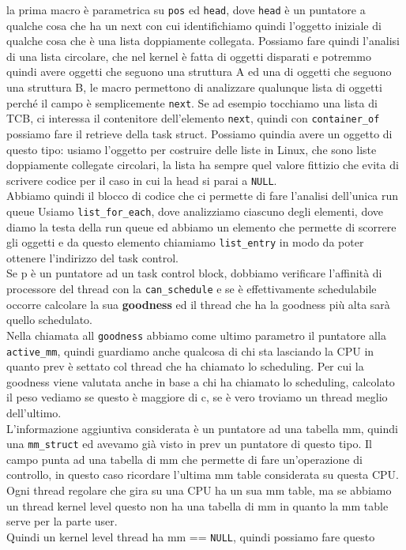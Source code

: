\documentclass[12pt, oneside]{extbook}
\begin{document}
la prima macro è parametrica su \texttt{pos} ed \texttt{head}, dove \texttt{head} è un puntatore a qualche cosa che ha un next con cui identifichiamo quindi l'oggetto iniziale di qualche cosa che è una lista doppiamente collegata. Possiamo fare quindi l'analisi di una lista circolare, che nel kernel è fatta di oggetti disparati e potremmo quindi avere oggetti che seguono una struttura A ed una di oggetti che seguono una struttura B, le macro permettono di analizzare qualunque lista di oggetti perché il campo è semplicemente \texttt{next}. Se ad esempio tocchiamo una lista di TCB, ci interessa il contenitore dell'elemento \texttt{next}, quindi con \texttt{container\_of} possiamo fare il retrieve della task struct. Possiamo quindia avere un oggetto di questo tipo:
usiamo l'oggetto per costruire delle liste in Linux, che sono liste doppiamente collegate circolari, la lista ha sempre quel valore fittizio che evita di scrivere codice per il caso in cui la head si parai a \texttt{NULL}.\\Abbiamo quindi il blocco di codice che ci permette di fare l'analisi dell'unica run queue
Usiamo \texttt{list\_for\_each}, dove analizziamo ciascuno degli elementi, dove diamo la testa della run queue ed abbiamo un elemento che permette di scorrere gli oggetti e da questo elemento chiamiamo \texttt{list\_entry} in modo da poter ottenere l'indirizzo del task control.\\Se p è un puntatore ad un task control block, dobbiamo verificare l'affinità di processore del thread con la \texttt{can\_schedule} e se è effettivamente schedulabile occorre calcolare la sua \textbf{goodness} ed il thread che ha la goodness più alta sarà quello schedulato.\\Nella chiamata all \texttt{goodness} abbiamo come ultimo parametro il puntatore alla \texttt{active\_mm}, quindi guardiamo anche qualcosa di chi sta lasciando la CPU in quanto prev è settato col thread che ha chiamato lo scheduling. Per cui la goodness viene valutata anche in base a chi ha chiamato lo scheduling, calcolato il peso vediamo se questo è maggiore di c, se è vero troviamo un thread meglio dell'ultimo.\\L'informazione aggiuntiva considerata è un puntatore ad una tabella mm, quindi una \texttt{mm\_struct} ed avevamo già visto in prev un puntatore di questo tipo. Il campo punta ad una tabella di mm che permette di fare un'operazione di controllo, in questo caso ricordare l'ultima mm table considerata su questa CPU.\\Ogni thread regolare che gira su una CPU ha un sua mm table, ma se abbiamo un thread kernel level questo non ha una tabella di mm in quanto la mm table serve per la parte user.\\Quindi un kernel level thread ha mm == \texttt{NULL}, quindi possiamo fare questo
\end{document}
